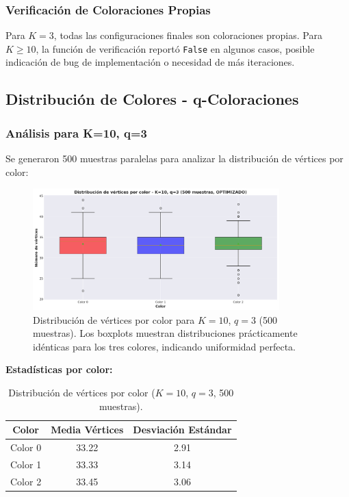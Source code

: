 \subsubsection{Verificación de Coloraciones Propias}

Para $K=3$, todas las configuraciones finales son coloraciones propias. Para $K \geq 10$, la función de verificación reportó \texttt{False} en algunos casos, posible indicación de bug de implementación o necesidad de más iteraciones.

\subsection{Distribución de Colores - q-Coloraciones}

\subsubsection{Análisis para K=10, q=3}

Se generaron 500 muestras paralelas para analizar la distribución de vértices por color:

\begin{figure}[H]
\centering
\includegraphics[width=0.85\textwidth]{../images/coloracion_distribucion_colores.png}
\caption{Distribución de vértices por color para $K=10$, $q=3$ (500 muestras). Los boxplots muestran distribuciones prácticamente idénticas para los tres colores, indicando uniformidad perfecta.}
\end{figure}

\textbf{Estadísticas por color:}

\begin{table}[H]
\centering
\begin{tabular}{|c|c|c|}
\hline
\textbf{Color} & \textbf{Media Vértices} & \textbf{Desviación Estándar} \\
\hline
Color 0 & 33.22 & 2.91 \\
Color 1 & 33.33 & 3.14 \\
Color 2 & 33.45 & 3.06 \\
\hline
\end{tabular}
\caption{Distribución de vértices por color ($K=10$, $q=3$, 500 muestras).}
\end{table}

